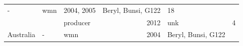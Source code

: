 \begin{longtable}[]{@{}lllrlr@{}}
\begin{minipage}[t]{0.08\columnwidth}
-\strut
\end{minipage} & \begin{minipage}[t]{0.12\columnwidth}\raggedright\strut
wmn\strut
\end{minipage} & \begin{minipage}[t]{0.19\columnwidth}\raggedleft\strut
2004, 2005\strut
\end{minipage} & \begin{minipage}[t]{0.29\columnwidth}\raggedright\strut
Beryl, Bunsi, G122\strut
\end{minipage} & \begin{minipage}[t]{0.04\columnwidth}\raggedleft\strut
18\strut
\end{minipage}\tabularnewline
\begin{minipage}[t]{0.11\columnwidth}\raggedright\strut
\strut
\end{minipage} & \begin{minipage}[t]{0.08\columnwidth}\raggedright\strut
\strut
\end{minipage} & \begin{minipage}[t]{0.12\columnwidth}\raggedright\strut
producer\strut
\end{minipage} & \begin{minipage}[t]{0.19\columnwidth}\raggedleft\strut
2012\strut
\end{minipage} & \begin{minipage}[t]{0.29\columnwidth}\raggedright\strut
unk\strut
\end{minipage} & \begin{minipage}[t]{0.04\columnwidth}\raggedleft\strut
4\strut
\end{minipage}\tabularnewline
\begin{minipage}[t]{0.11\columnwidth}\raggedright\strut
Australia\strut
\end{minipage} & \begin{minipage}[t]{0.08\columnwidth}\raggedright\strut
-\strut
\end{minipage} & \begin{minipage}[t]{0.12\columnwidth}\raggedright\strut
wmn\strut
\end{minipage} & \begin{minipage}[t]{0.19\columnwidth}\raggedleft\strut
2004\strut
\end{minipage} & \begin{minipage}[t]{0.29\columnwidth}\raggedright\strut
Beryl, Bunsi, G122\strut
\end{minipage} & \begin{minipage}[t]{0.04\columnwidth}\raggedleft\strut

\end{minipage}
\end{longtable}

